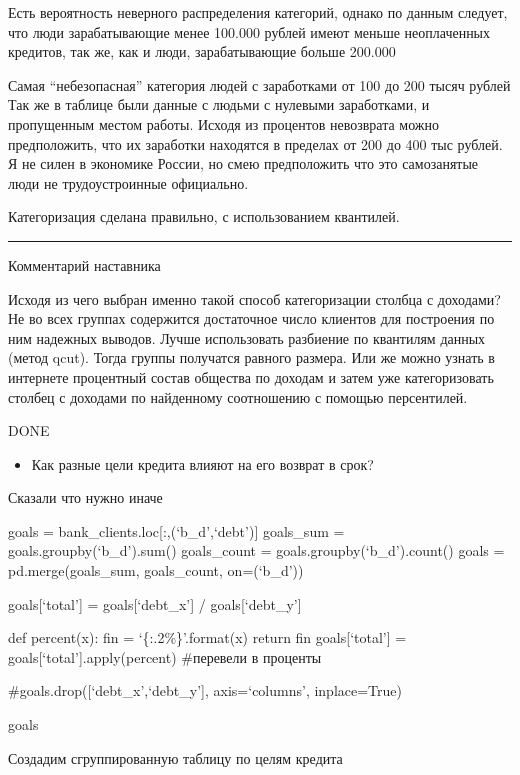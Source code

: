 \documentclass[11pt]{article}
\providecommand{\tightlist}{%
      \setlength{\itemsep}{0pt}\setlength{\parskip}{0pt}}
\begin{document}
    Есть вероятность неверного распределения категорий, однако по данным
следует, что люди зарабатывающие менее 100.000 рублей имеют меньше
неоплаченных кредитов, так же, как и люди, зарабатывающие больше 200.000

Самая ``небезопасная'' категория людей с заработками от 100 до 200 тысяч
рублей Так же в таблице были данные с людьми с нулевыми заработками, и
пропущенным местом работы. Исходя из процентов невозврата можно
предположить, что их заработки находятся в пределах от 200 до 400 тыс
рублей. Я не силен в экономике России, но смею предположить что это
самозанятые люди не трудоустроинные официально.

    Категоризация сделана правильно, с использованием квантилей.

\begin{center}\rule{0.5\linewidth}{0.5pt}\end{center}

    Комментарий наставника

Исходя из чего выбран именно такой способ категоризации столбца с
доходами? Не во всех группах содержится достаточное число клиентов для
построения по ним надежных выводов. Лучше использовать разбиение по
квантилям данных (метод qcut). Тогда группы получатся равного размера.
Или же можно узнать в интернете процентный состав общества по доходам и
затем уже категоризовать столбец с доходами по найденному соотношению с
помощью персентилей.

    DONE

    \begin{itemize}
\tightlist
\item
  Как разные цели кредита влияют на его возврат в срок?
\end{itemize}

    Сказали что нужно иначе

goals = bank\_clients.loc{[}:,(`b\_d',`debt'){]} goals\_sum =
goals.groupby(`b\_d').sum() goals\_count = goals.groupby(`b\_d').count()
goals = pd.merge(goals\_sum, goals\_count, on=(`b\_d'))

goals{[}`total'{]} = goals{[}`debt\_x'{]} / goals{[}`debt\_y'{]}

def percent(x): fin = `\{:.2\%\}'.format(x) return fin
goals{[}`total'{]} = goals{[}`total'{]}.apply(percent) \#перевели в
проценты

\#goals.drop({[}`debt\_x',`debt\_y'{]}, axis=`columns', inplace=True)

goals

    Создадим сгруппированную таблицу по целям кредита
\end{document}
